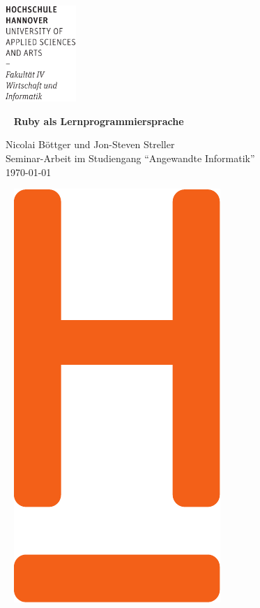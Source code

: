 \documentclass[12pt,DIV=14, version=first, BCOR=10mm,a4paper,twoside,parskip=half-,headsepline,headinclude]{scrartcl}
\begin{document}
  \thispagestyle{empty} %
\includegraphics[width=0.2\textwidth]{Wortmarke_WI_schwarz}

   {  ~ \sffamily
  \vfill
  {\Huge\bfseries Ruby als Lernprogrammiersprache}
  \bigskip

  {\Large 
  Nicolai Böttger und Jon-Steven Streller \\[2ex]
 Seminar-Arbeit im Studiengang "`Angewandte Informatik"'
 \\[5ex]
   \today } 
}
 \vfill
  
  ~ \hfill
  \includegraphics[height=0.3\paperheight]{H_WI_Pantone1665} 

\vspace*{-3cm}
\end{document}
